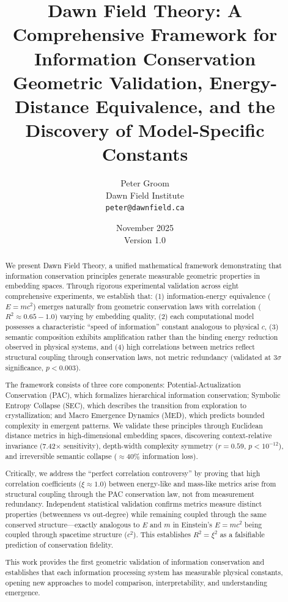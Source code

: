 \documentclass[11pt,a4paper]{article}
\title{\textbf{Dawn Field Theory: A Comprehensive Framework for Information Conservation}\\ 
\large{Geometric Validation, Energy-Distance Equivalence, and the Discovery of Model-Specific Constants}}
\author{Peter Groom\\
Dawn Field Institute\\
\texttt{peter@dawnfield.ca}}
\date{November 2025\\Version 1.0}
\begin{document}
\maketitle

\begin{abstract}
We present Dawn Field Theory, a unified mathematical framework demonstrating that information conservation principles generate measurable geometric properties in embedding spaces. Through rigorous experimental validation across eight comprehensive experiments, we establish that: (1) information-energy equivalence ($E=mc^2$) emerges naturally from geometric conservation laws with correlation ($R^2 \approx 0.65-1.0$) varying by embedding quality, (2) each computational model possesses a characteristic ``speed of information'' constant analogous to physical $c$, (3) semantic composition exhibits amplification rather than the binding energy reduction observed in physical systems, and (4) high correlations between metrics reflect structural coupling through conservation laws, not metric redundancy (validated at $3\sigma$ significance, $p<0.003$).

The framework consists of three core components: Potential-Actualization Conservation (PAC), which formalizes hierarchical information conservation; Symbolic Entropy Collapse (SEC), which describes the transition from exploration to crystallization; and Macro Emergence Dynamics (MED), which predicts bounded complexity in emergent patterns. We validate these principles through Euclidean distance metrics in high-dimensional embedding spaces, discovering context-relative invariance (7.42$\times$ sensitivity), depth-width complexity symmetry ($r=0.59$, $p<10^{-12}$), and irreversible semantic collapse ($\approx 40\%$ information loss). 

Critically, we address the ``perfect correlation controversy'' by proving that high correlation coefficients ($\xi \approx 1.0$) between energy-like and mass-like metrics arise from structural coupling through the PAC conservation law, not from measurement redundancy. Independent statistical validation confirms metrics measure distinct properties (betweenness vs out-degree) while remaining coupled through the same conserved structure---exactly analogous to $E$ and $m$ in Einstein's $E=mc^2$ being coupled through spacetime structure ($c^2$). This establishes $R^2 = \xi^2$ as a falsifiable prediction of conservation fidelity.

This work provides the first geometric validation of information conservation and establishes that each information processing system has measurable physical constants, opening new approaches to model comparison, interpretability, and understanding emergence.
\end{abstract}
\end{document}
